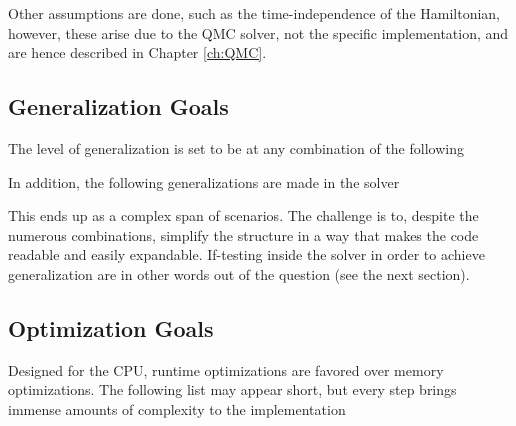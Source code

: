Other assumptions are done, such as the time-independence of the Hamiltonian, however, these arise due to the QMC solver, not the specific implementation, and are hence described in Chapter \ref{ch:QMC}.

\subsection{Generalization Goals}
\label{sec:genGoals}

The level of generalization is set to be at any combination of the following

 
In addition, the following generalizations are made in the solver



This ends up as a complex span of scenarios. The challenge is to, despite the numerous combinations, simplify the structure in a way that makes the code readable and easily expandable. If-testing inside the solver in order to achieve generalization are in other words out of the question (see the next section).

\subsection{Optimization Goals}
\label{sec:optGoals}

Designed for the CPU, runtime optimizations are favored over memory optimizations. The following list may appear short, but every step brings immense amounts of complexity to the implementation

